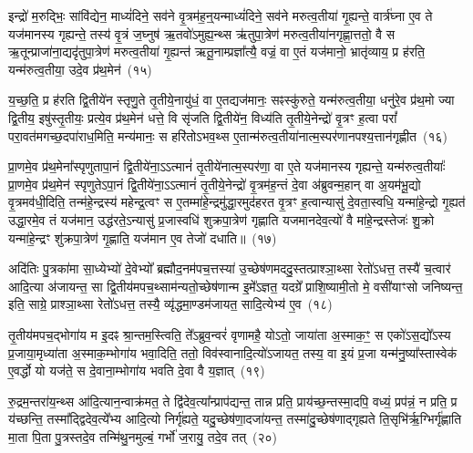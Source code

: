 {\anuvakamend[{तस्मा॑द॒सावा॑दि॒त्यस्त्रि॒ꣳ॒शच्च॑}]}%

इन्द्रो॑ म॒रुद्भिः॒ सांवि॑द्येन॒ माध्यं॑दिने॒ सव॑ने वृ॒त्रम॑ह॒न्॒यन्माध्यं॑दिने॒ सव॑ने मरुत्व॒तीया॑ गृ॒ह्यन्ते॒ वार्त्र॑घ्ना ए॒व ते यज॑मानस्य गृह्यन्ते॒ तस्य॑ वृ॒त्रं ज॒घ्नुष॑ ऋ॒तवो॑\-ऽमुह्य॒न्थ्स ऋ॑तुपा॒त्रेण॑ मरुत्व॒तीया॑नगृह्णा॒त्ततो॒ वै स ऋ॒तून्प्राजा॑ना॒द्यदृ॑तुपा॒त्रेण॑ मरुत्व॒तीया॑ गृ॒ह्यन्त॑ ऋतू॒नाम्प्रज्ञा᳚त्यै॒ वज्रं॒ वा ए॒तं यज॑मानो॒ भ्रातृ॑व्याय॒ प्र ह॑रति॒ यन्म॑रुत्व॒तीया॒ उदे॒व प्र॑थ॒मेन॑~(१५)

य॒च्छ॒ति॒ प्र ह॑रति द्वि॒तीये॑न स्तृणु॒ते तृ॒तीये॒नायु॑धं॒ वा ए॒तद्यज॑मानः॒ सꣴस्कु॑रुते॒ यन्म॑रुत्व॒तीया॒ धनु॑रे॒व प्र॑थ॒मो ज्या द्वि॒तीय॒ इषु॑स्तृ॒तीयः॒ प्रत्ये॒व प्र॑थ॒मेन॑ धत्ते॒ वि सृ॑जति द्वि॒तीये॑न॒ विध्य॑ति तृ॒तीये॒नेन्द्रो॑ वृ॒त्रꣳ ह॒त्वा परां᳚ परा॒वत॑मगच्छ॒दपा॑राध॒मिति॒ मन्य॑मानः॒ स हरि॑तो\-ऽभव॒थ्स ए॒तान्म॑रुत्व॒तीया॑नात्म॒स्पर॑णानपश्य॒त्तान॑गृह्णीत~(१६)

प्रा॒णमे॒व प्र॑थ॒मेना᳚स्पृणुतापा॒नं द्वि॒तीये॑ना॒ऽऽत्मानं॑ तृ॒तीये॑नात्म॒स्पर॑णा॒ वा ए॒ते यज॑मानस्य गृह्यन्ते॒ यन्म॑रुत्व॒तीयाः᳚ प्रा॒णमे॒व प्र॑थ॒मेन॑ स्पृणुते\-ऽपा॒नं द्वि॒तीये॑ना॒ऽऽत्मानं॑ तृ॒तीये॒नेन्द्रो॑ वृ॒त्रम॑ह॒न्तं दे॒वा अ॑ब्रुवन्म॒हान् वा अ॒यम॑भू॒द्यो वृ॒त्रमव॑धी॒दिति॒ तन्म॑हे॒न्द्रस्य॑ महेन्द्र॒त्वꣳ स ए॒तम्मा॑हे॒न्द्रमु॑द्धा॒रमुद॑हरत वृ॒त्रꣳ ह॒त्वान्यासु॑ दे॒वता॒स्वधि॒ यन्मा॑हे॒न्द्रो गृ॒ह्यत॑ उद्धा॒रमे॒व तं यज॑मान॒ उद्ध॑रते॒\-ऽन्यासु॑ प्र॒जास्वधि॑ शुक्रपा॒त्रेण॑ गृह्णाति यजमानदेव॒त्यो॑ वै मा॑हे॒न्द्रस्तेजः॑ शु॒क्रो यन्मा॑हे॒न्द्रꣳ शु॑क्रपा॒त्रेण॑ गृ॒ह्णाति॒ यज॑मान ए॒व तेजो॑ दधाति॥~(१७)

{\anuvakamend[{प्र॒थ॒मेना॑गृह्णीत दे॒वता᳚स्व॒ष्टाविꣳ॑शतिश्च}]}%

अदि॑तिः पु॒त्रका॑मा सा॒ध्येभ्यो॑ दे॒वेभ्यो᳚ ब्रह्मौद॒नम॑पच॒त्तस्या॑ उ॒च्छेष॑णमददु॒स्तत्प्राश्ञा॒थ्सा रेतो॑\-ऽधत्त॒ तस्यै॑ च॒त्वार॑ आदि॒त्या अ॑जायन्त॒ सा द्वि॒तीय॑मपच॒थ्साम॑न्यतो॒च्छेष॑णान्म इ॒मे᳚\-ऽज्ञत॒ यदग्रे᳚ प्राशि॒ष्यामी॒तो मे॒ वसी॑याꣳसो जनिष्यन्त॒ इति॒ साग्रे॒ प्राश्ञा॒थ्सा रेतो॑\-ऽधत्त॒ तस्यै॒ व्यृ॑द्धमा॒ण्डम॑जायत॒ सादि॒त्येभ्य॑ ए॒व~(१८)

तृ॒तीय॑मपच॒द्भोगा॑य म इ॒दꣴ श्रा॒न्तम॒स्त्विति॒ ते᳚\-ऽब्रुव॒न्वरं॑ वृणामहै॒ यो\-ऽतो॒ जाया॑ता अ॒स्माक॒ꣳ॒ स एको॑\-ऽस॒द्यो᳚\-ऽस्य प्र॒जाया॒मृध्या॑ता अ॒स्माक॒म्भोगा॑य भवा॒दिति॒ ततो॒ विव॑स्वानादि॒त्यो॑\-ऽजायत॒ तस्य॒ वा इ॒यं प्र॒जा यन्म॑नु॒ष्या᳚स्तास्वेक॑ ए॒वर्द्धो यो यज॑ते॒ स दे॒वाना॒म्भोगा॑य भवति दे॒वा वै य॒ज्ञात्~(१९)

रु॒द्रम॒न्तरा॑य॒न्थ्स आ॑दि॒त्यान॒न्वाक्र॑मत॒ ते द्वि॑देव॒त्या᳚न्प्राप॑द्यन्त॒ तान्न प्रति॒ प्राय॑च्छ॒न्तस्मा॒दपि॒ वध्यं॒ प्रप॑न्नं॒ न प्रति॒ प्र य॑च्छन्ति॒ तस्मा᳚द्द्विदेव॒त्ये᳚भ्य आदि॒त्यो निर्गृ॑ह्यते॒ यदु॒च्छेष॑णा॒दजा॑यन्त॒ तस्मा॑दु॒च्छेष॑णाद्गृह्यते ति॒सृभि॑र्\mbox{}ऋ॒ग्भिर्गृ॑ह्णाति मा॒ता पि॒ता पु॒त्रस्तदे॒व तन्मि॑थु॒नमुल्बं॒ गर्भो॑ ज॒रायु॒ तदे॒व तत्~(२०)

